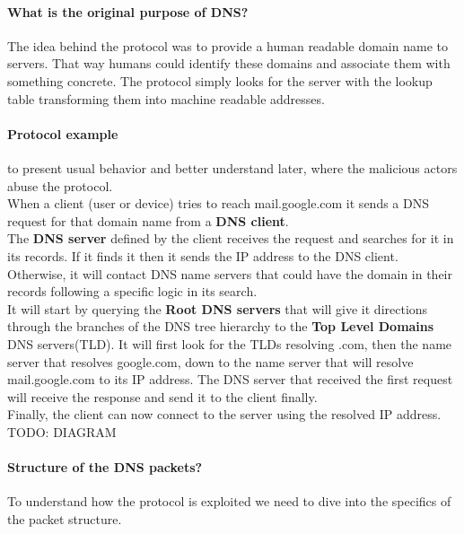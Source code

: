 \paragraph{What is the original purpose of DNS?}
The idea behind the protocol was to provide a human readable domain name to servers. That way humans could identify these domains and associate them with something concrete. The protocol simply looks for the server with the lookup table transforming them into machine readable addresses.
\cite{dns1}

\paragraph{Protocol example} to present usual behavior and better understand later, where the malicious actors abuse the protocol.\\
\cite{dns2}
When a client (user or device) tries to reach mail.google.com it sends a DNS request for that domain name from a \textbf{DNS client}.\\
The \textbf{DNS server} defined by the client receives the request and searches for it in its records. If it finds it then it sends the IP address to the DNS client. Otherwise, it will contact DNS name servers that could have the domain in their records following a specific logic in its search.\\
It will start by querying the \textbf{Root DNS servers} that will give it directions through the branches of the DNS tree hierarchy to the \textbf{Top Level Domains} DNS servers(TLD). It will first look for the TLDs resolving .com, then the name server that resolves google.com, down to the name server that will resolve mail.google.com to its IP address. The DNS server that received the first request will receive the response and send it to the client finally.\\
Finally, the client can now connect to the server using the resolved IP address.\\
TODO: DIAGRAM \cite{dns3}

\paragraph{Structure of the DNS packets?} To understand how the protocol is exploited we need to dive into the specifics of the packet structure.

